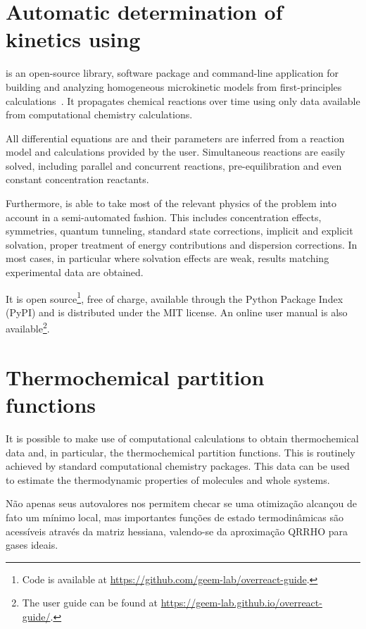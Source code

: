 \section{Automatic determination of kinetics using \overreact}%
\label{sec:overreact-methods}

\overreact{} is an open-source library, software package and command-line
application for building and analyzing
homogeneous microkinetic models from first-principles
calculations~\cite{Schneider2022,overreact2021zenodo}.
It propagates chemical reactions over time using only data available from
computational chemistry calculations.

All differential equations are and their parameters are inferred from a
reaction model and calculations provided by the user.
Simultaneous reactions are easily solved, including parallel and concurrent
reactions, pre-equilibration and even constant concentration reactants.

Furthermore, \overreact{} is able to take most of the relevant physics of the problem into
account in a semi-automated fashion.
This includes concentration effects, symmetries, quantum
tunneling, standard state corrections, implicit and explicit solvation, proper treatment
of energy contributions and dispersion corrections.
In most cases, in particular where solvation effects are weak, results matching
experimental data are obtained.

It is open source\footnote{Code is available at
\url{https://github.com/geem-lab/overreact-guide}.}, free of charge, available through the Python Package Index (PyPI) and is
distributed under the MIT license.
An online user manual is also
available\footnote{The user guide can be found at \url{https://geem-lab.github.io/overreact-guide/}.}.



\section{Thermochemical partition functions}

It is possible to make use of computational calculations to obtain
thermochemical data and, in particular, the thermochemical partition
functions.
This is routinely achieved by standard computational chemistry packages.
This data can be used to estimate the thermodynamic properties of molecules and
whole systems.


Não apenas seus autovalores nos permitem checar se uma otimização alcançou de fato um mínimo local, mas importantes funções de estado termodinâmicas são acessíveis através da matriz hessiana, valendo-se da aproximação QRRHO para gases ideais.



